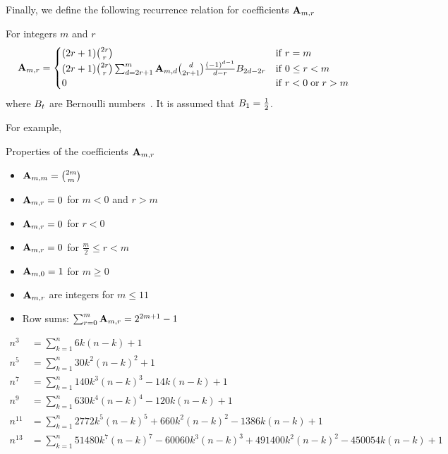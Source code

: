 Finally, we define the following recurrence relation for coefficients ${\mathbf{A}} \sb{m,r}$
\begin{proposition}
    For integers $m$ and $r$
    \label{prop:coefficients_a}
    \begin{align*}
        {\mathbf{A}} \sb{m,r} =
        \begin{cases}
        (2r+1)
            \binom{2r}{r} & \mathrm{if} \; r=m \\
            (2r+1) \binom{2r}{r} \sum_{d = 2r+1}^{m} {\mathbf{A}} \sb{m,d} \binom{d}{2r+1} \frac{(-1)^{d-1}}{d-r}
            {B}\sb{2d-2r} & \mathrm{if} \; 0 \leq r<m \\
            0 & \mathrm{if} \; r<0 \; \mathrm{or} \; r>m
        \end{cases}
    \end{align*}
    where ${B}\sb{t}$ are Bernoulli numbers~\cite{bateman1953higher}.
    It is assumed that ${B}\sb{1}=\frac{1}{2}$.
\end{proposition}

For example,

Properties of the coefficients ${\mathbf{A}} \sb{m,r}$
\begin{itemize}
    \item ${\mathbf{A}} \sb{m,m} = \binom{2m}{m}$
    \item ${\mathbf{A}} \sb{m,r} = 0$ for $m < 0$ and $r > m$
    \item ${\mathbf{A}} \sb{m,r} = 0$ for $r < 0$
    \item ${\mathbf{A}} \sb{m,r} = 0$ for $\frac{m}{2} \leq r < m$
    \item ${\mathbf{A}} \sb{m,0} = 1$ for $m \geq 0$
    \item ${\mathbf{A}} \sb{m,r}$ are integers for $m \leq 11$
    \item Row sums: $\sum_{r=0}^{m} {\mathbf{A}} \sb{m,r} = 2^{2m+1} - 1$
\end{itemize}

\begin{align*}
    n^3 &= \sum_{k=1}^{n} 6k(n-k) + 1 \\
    n^5 &= \sum_{k=1}^{n} 30k^2(n-k)^2 + 1 \\
    n^7 &= \sum_{k=1}^{n} 140 k^3 (n-k)^3 - 14k(n-k) + 1 \\
    n^9 &= \sum_{k=1}^{n} 630 k^4(n-k)^4 - 120k(n-k) + 1 \\
    n^{11} &= \sum_{k=1}^{n} 2772 k^5(n-k)^5 + 660 k^2(n-k)^2 - 1386k(n-k) + 1 \\
    n^{13} &= \sum_{k=1}^{n} 51480 k^7(n-k)^7 - 60060 k^3(n-k)^3 + 491400k^2(n-k)^{2} - 450054k(n-k) + 1
\end{align*}
